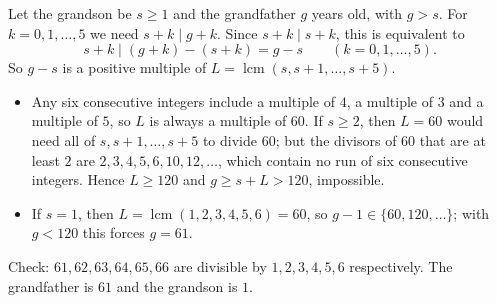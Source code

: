 Let the grandson be $s\ge1$ and the grandfather $g$ years old, with $g>s$. For $k=0,1,\dots,5$ we need $s+k\mid g+k$. Since $s+k\mid s+k$, this is equivalent to
\[
s+k\mid (g+k)-(s+k)=g-s\qquad(k=0,1,\dots,5).
\]
So $g-s$ is a positive multiple of $L=\operatorname{lcm}(s,s+1,\dots,s+5)$.
\begin{itemize}
\item Any six consecutive integers include a multiple of $4$, a multiple of $3$ and a multiple of $5$, so $L$ is always a multiple of $60$. If $s\ge2$, then $L=60$ would need all of $s,s+1,\dots,s+5$ to divide $60$; but the divisors of $60$ that are at least $2$ are $2,3,4,5,6,10,12,\dots$, which contain no run of six consecutive integers. Hence $L\ge120$ and $g\ge s+L>120$, impossible.
\item If $s=1$, then $L=\operatorname{lcm}(1,2,3,4,5,6)=60$, so $g-1\in\{60,120,\dots\}$; with $g<120$ this forces $g=61$.
\end{itemize}
Check: $61,62,63,64,65,66$ are divisible by $1,2,3,4,5,6$ respectively. The grandfather is $\boxed{61}$ and the grandson is $\boxed{1}$.
